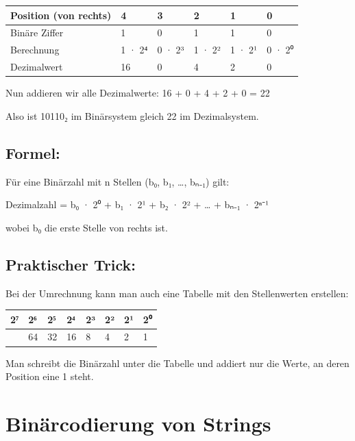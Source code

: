 \documentclass[
  nswissgerman,
  a4paper,
  DIV=11,
  numbers=noendperiod,
  ngerman]{scrreprt}
\newcounter{none} %
\begin{document}
{\def\LTcaptype{none} %
\begin{longtable}[]{@{}llllll@{}}
\toprule\noalign{}
Position (von rechts) & 4 & 3 & 2 & 1 & 0 \\
\midrule\noalign{}
\endhead
\bottomrule\noalign{}
\endlastfoot
Binäre Ziffer & 1 & 0 & 1 & 1 & 0 \\
Berechnung & 1 · 2⁴ & 0 · 2³ & 1 · 2² & 1 · 2¹ & 0 · 2⁰ \\
Dezimalwert & 16 & 0 & 4 & 2 & 0 \\
\end{longtable}
}

Nun addieren wir alle Dezimalwerte: 16 + 0 + 4 + 2 + 0 = 22

Also ist 10110₂ im Binärsystem gleich 22 im Dezimalsystem.

\subsection{Formel:}\label{formel}

Für eine Binärzahl mit n Stellen (b₀, b₁, \ldots, bₙ₋₁) gilt:

Dezimalzahl = b₀ · 2⁰ + b₁ · 2¹ + b₂ · 2² + \ldots{} + bₙ₋₁ · 2ⁿ⁻¹

wobei b₀ die erste Stelle von rechts ist.

\subsection{Praktischer Trick:}\label{praktischer-trick}

Bei der Umrechnung kann man auch eine Tabelle mit den Stellenwerten
erstellen:

{\def\LTcaptype{none} %
\begin{longtable}[]{@{}llllllll@{}}
\toprule\noalign{}
2⁷ & 2⁶ & 2⁵ & 2⁴ & 2³ & 2² & 2¹ & 2⁰ \\
\midrule\noalign{}
\endhead
\bottomrule\noalign{}
\endlastfoot
128 & 64 & 32 & 16 & 8 & 4 & 2 & 1 \\
\end{longtable}
}

Man schreibt die Binärzahl unter die Tabelle und addiert nur die Werte,
an deren Position eine 1 steht.

\section{Binärcodierung von
Strings}\label{binuxe4rcodierung-von-strings}
\end{document}
